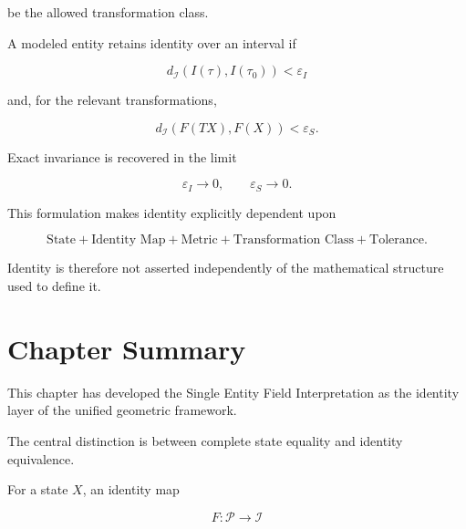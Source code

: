 \documentclass[12pt,oneside]{book}
\begin{document}
be the allowed transformation class.

A modeled entity retains identity over an interval if

\begin{equation}
    d_{\mathcal{I}}
    \left(
        I(\tau),
        I(\tau_0)
    \right)
    <
    \varepsilon_I
    \label{eq:unified-identity-persistence}
\end{equation}

and, for the relevant transformations,

\begin{equation}
    d_{\mathcal{I}}
    \left(
        F(TX),
        F(X)
    \right)
    <
    \varepsilon_S.
    \label{eq:unified-sovereignty-condition}
\end{equation}

Exact invariance is recovered in the limit

\begin{equation}
    \varepsilon_I
    \rightarrow
    0,
    \qquad
    \varepsilon_S
    \rightarrow
    0.
\end{equation}

This formulation makes identity explicitly dependent upon

\begin{equation}
    \boxed{
    \text{State}
    +
    \text{Identity Map}
    +
    \text{Metric}
    +
    \text{Transformation Class}
    +
    \text{Tolerance}
    }.
    \label{eq:identity-dependency-box}
\end{equation}

Identity is therefore not asserted independently of the
mathematical structure used to define it.


\section{Chapter Summary}
\label{sec:identity-chapter-summary}

This chapter has developed the Single Entity Field
Interpretation as the identity layer of the unified geometric
framework.

The central distinction is between complete state equality and
identity equivalence.

For a state \(X\), an identity map

\begin{equation}
    F:
    \mathcal{P}
    \rightarrow
    \mathcal{I}
\end{equation}
\end{document}
